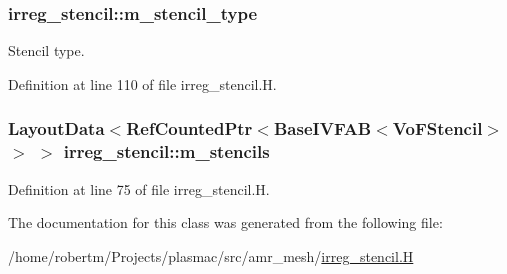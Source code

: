 \subsubsection[{\texorpdfstring{m\+\_\+stencil\+\_\+type}{m_stencil_type}}]{ irreg\+\_\+stencil\+::m\+\_\+stencil\+\_\+type\hspace{0.3cm}{\ttfamily [protected]}}\hypertarget{classirreg__stencil_a948de19056327d2d6334a5e04059c5d0}{}\label{classirreg__stencil_a948de19056327d2d6334a5e04059c5d0}


Stencil type. 



Definition at line 110 of file irreg\+\_\+stencil.\+H.

\subsubsection[{\texorpdfstring{m\+\_\+stencils}{m_stencils}}]{\setlength{\rightskip}{0pt plus 5cm}Layout\+Data$<$Ref\+Counted\+Ptr$<$Base\+I\+V\+F\+AB$<$Vo\+F\+Stencil$>$ $>$ $>$ irreg\+\_\+stencil\+::m\+\_\+stencils\hspace{0.3cm}{\ttfamily [protected]}}\hypertarget{classirreg__stencil_af70021e93b3b562d078fa5f554758799}{}\label{classirreg__stencil_af70021e93b3b562d078fa5f554758799}


Definition at line 75 of file irreg\+\_\+stencil.\+H.



The documentation for this class was generated from the following file\+:\begin{DoxyCompactItemize}
\item 
/home/robertm/\+Projects/plasmac/src/amr\+\_\+mesh/\hyperlink{irreg__stencil_8H}{irreg\+\_\+stencil.\+H}\end{DoxyCompactItemize}
